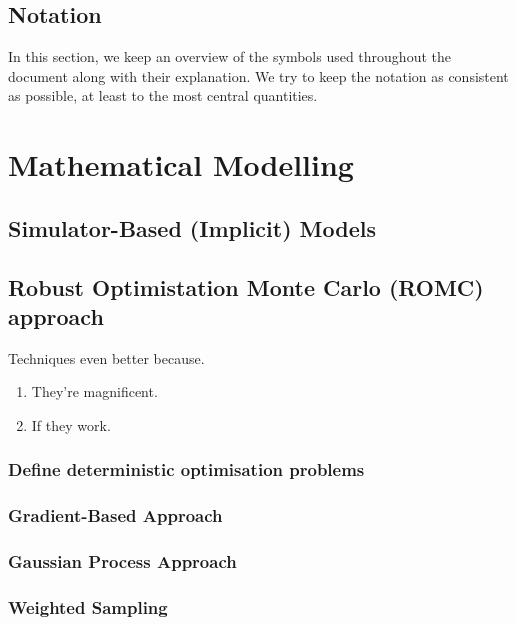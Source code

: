 \documentclass[11pt,twoside]{article}
\numberwithin{Theorem}{section}
\numberwithin{Definition}{section}
\numberwithin{Lemma}{section}
\numberwithin{Algorithm}{section}
\numberwithin{equation}{section}
\begin{document}
\subsection{Notation}

In this section, we keep an overview of the symbols used throughout the document along with their explanation. We try to keep the notation as consistent as possible, at least to the most central quantities.

\clearpage

\section{Mathematical Modelling}
\label{sec:background}

\clearpage

\subsection{Simulator-Based (Implicit) Models}


\clearpage

\subsection{Robust Optimistation Monte Carlo (ROMC) approach}
\label{sec:Techniques}

Techniques even better because.
\begin{enumerate}
 \item They're magnificent.
 \item If they work.
\end{enumerate}
\clearpage

\subsubsection{Define deterministic optimisation problems}

\subsubsection{Gradient-Based Approach}

\subsubsection{Gaussian Process Approach}

\subsubsection{Weighted Sampling}
\end{document}
